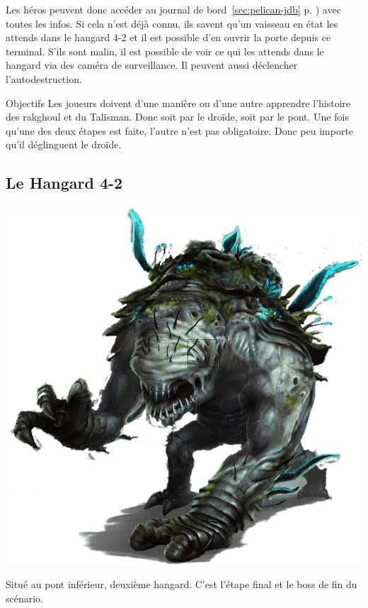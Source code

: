 Les héros peuvent donc accéder au journal de bord~\ref{sec:pelican-jdb} p. \pageref{sec:pelican-jdb}) avec toutes les infos. Si cela n’est déjà connu, ils savent qu’un vaisseau en état les attends dans le hangard 4-2 et il est possible d’en ouvrir la porte depuis ce terminal. S’ils sont malin, il est possible de voir ce qui les attends dans le hangard via des caméra de surveillance. Il peuvent aussi déclencher l’autodestruction.

\begin{paperbox}{Objectifs}
Les joueurs doivent d’une manière ou d’une autre apprendre l’histoire des rakghoul et du Talisman. Donc soit par le droïde, soit par le pont. Une fois qu’une des deux étapes est faite, l’autre n’est pas obligatoire. Donc peu importe qu’il déglinguent le droïde.
\end{paperbox}

\subsection{Le Hangard 4-2}

\noindent\includegraphics[width=\linewidth]{_img/dos-au-muur/rakghoul-amblyope.png}

Situé au pont inférieur, deuxième hangard. C’est l’étape final et le boss de fin du scénario.

